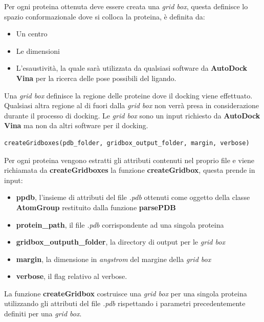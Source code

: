 Per ogni proteina ottenuta deve essere creata una \textit{grid box}, questa definisce lo spazio conformazionale dove si colloca la proteina, è definita da:

\begin{itemize}
    \item Un centro
    \item Le dimensioni
    \item L'esaustività, la quale sarà utilizzata da qualsiasi software da \textbf{AutoDock Vina} per la ricerca delle pose possibili del ligando.
\end{itemize}

Una \textit{grid box} definisce la regione delle proteine dove il docking viene effettuato. Qualsiasi altra regione al di fuori dalla \textit{grid box} non verrà presa in considerazione durante il processo di docking.\newline
Le \textit{grid box} sono un input richiesto da \textbf{AutoDock Vina} ma non da altri software per il docking.\newline

\begin{lstlisting}[language=Python, label=lst:code28, caption={createGridboxes}]
createGridboxes(pdb_folder, gridbox_output_folder, margin, verbose)
\end{lstlisting}

Per ogni proteina vengono estratti gli attributi contenuti nel proprio file e viene richiamata da \textbf{createGridboxes} la funzione \textbf{createGridbox}, questa prende in input: 

\begin{itemize}    
    \item \textbf{ppdb}, l'insieme di attributi del file \textit{.pdb} ottenuti come oggetto della classe \textbf{AtomGroup} restituito dalla funzione \textbf{parsePDB}
    \item \textbf{protein\_path}, il file \textit{.pdb} corrispondente ad una singola proteina
    \item \textbf{gridbox\_outputh\_folder}, la directory di output per le \textit{grid box}
    \item \textbf{margin}, la dimensione in \textit{angstrom} del margine della \textit{grid box}
    \item \textbf{verbose}, il flag relativo al verbose.
\end{itemize}

La funzione \textbf{createGridbox} costruisce una \textit{grid box} per una singola proteina utilizzando gli attributi del file \textit{.pdb} rispettando i parametri precedentemente definiti per una \textit{grid box}.

